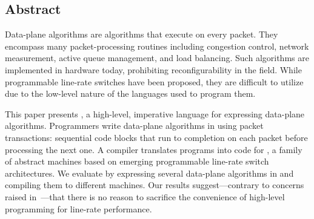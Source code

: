 \subsection*{Abstract}
Data-plane algorithms are algorithms that execute on every packet. They
encompass many packet-processing routines including congestion control, network
measurement, active queue management, and load balancing. Such algorithms are
implemented in hardware today, prohibiting reconfigurability in the field.
While programmable line-rate switches have been proposed, they are difficult to
utilize due to the low-level nature of the languages used to program them.

This paper presents \pktlanguage, a high-level, imperative language for
expressing data-plane algorithms. Programmers write data-plane algorithms in
\pktlanguage using packet transactions: sequential code blocks that run to
completion on each packet before processing the next one. A compiler translates
\pktlanguage programs into code for \absmachine, a family of abstract machines
based on emerging programmable line-rate switch architectures. We evaluate
\pktlanguage by expressing several data-plane algorithms in \pktlanguage and
compiling them to different \absmachine machines. Our results suggest---contrary
to concerns raised in~\cite{p4}---that there is no reason to sacrifice the
convenience of high-level programming for line-rate performance.
